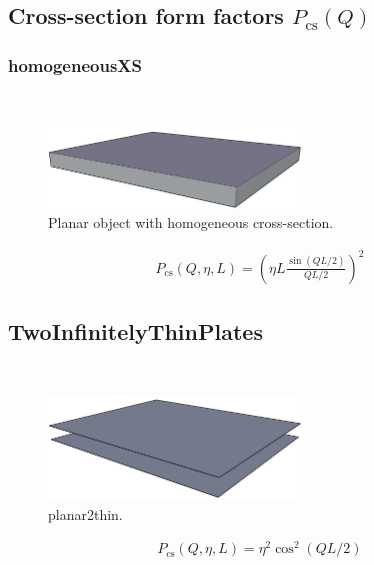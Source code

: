 \clearpage

\subsection{Cross-section form factors $P_\text{cs}(Q)$}

\subsubsection{homogeneousXS}
\label{sect:homogeneousXS}
\hspace{1pt} \\
\begin{figure}[htb]
\begin{center}
\includegraphics[width=0.6\textwidth,height=0.4\textwidth]{planarHomo.png}
\end{center}
\caption{Planar object with homogeneous cross-section.}
\label{fig:planarHomo}
\end{figure}

\begin{align}
P_\text{cs}(Q,\eta,L) = \left( \eta L\frac{\sin(QL/2)}{QL/2}\right)^2
\end{align}

\clearpage
\subsection{TwoInfinitelyThinPlates}
\label{sect:TwoInfinitelyThinPlates}
\hspace{1pt} \\
\begin{figure}[htb]
\begin{center}
\includegraphics[width=0.6\textwidth,height=0.4\textwidth]{planar2thin.png}
\end{center}
\caption{planar2thin.}
\label{fig:planar2thin}
\end{figure}
\begin{align}
P_\text{cs}(Q,\eta,L) = \eta^2 \cos^2(QL/2)
\end{align}


